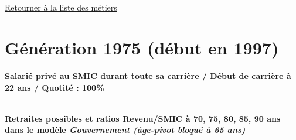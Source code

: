 ~\\ 
 


   
 \localtableofcontents 

~\\ 
 
 \hyperlink{page.2}{\noindent Retourner à la liste des métiers}

 \newpage 

\section{Génération 1975 (début en 1997)\label{SMIC_100_1975_22_0}} 
 
{\bf \noindent Salarié privé au SMIC durant toute sa carrière / Début de carrière à 22 ans / Quotité : 100\%}  ~ 

 ~\\{\bf \noindent Retraites possibles et ratios Revenu/SMIC à 70, 75, 80, 85, 90 ans dans le modèle \emph{Gouvernement (âge-pivot bloqué à 65 ans)}}  
 

